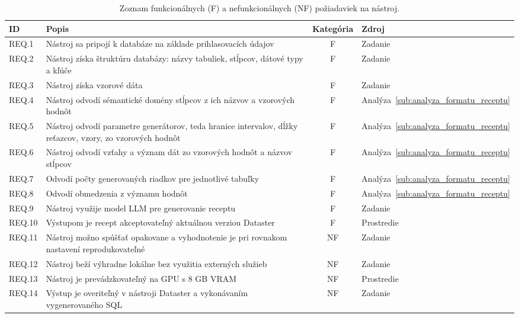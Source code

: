\begin{table}[H]
    \centering
    \begin{tabularx}{\textwidth}{l X c l}
         \toprule
         \textbf{ID} & \textbf{Popis} & \textbf{Kategória} & \textbf{Zdroj} \\
         \midrule
        REQ.1   & Nástroj sa pripojí k databáze na základe prihlasovacích údajov  & F & Zadanie \\ 
        REQ.2   & Nástroj získa štruktúru databázy: názvy tabuliek, stĺpcov, dátové typy a kľúče & F & Zadanie \\
        REQ.3   & Nástroj získa vzorové dáta & F & Zadanie \\ 
        REQ.4   & Nástroj odvodí sémantické domény stĺpcov z ich názvov a vzorových hodnôt & F & Analýza~\ref{sub:analyza_formatu_receptu} \\ 
        REQ.5   & Nástroj odvodí parametre generátorov, teda hranice intervalov, dĺžky reťazcov, vzory, zo vzorových hodnôt & F & Analýza~\ref{sub:analyza_formatu_receptu} \\ 
        REQ.6   & Nástroj odvodí vzťahy a význam dát zo vzorových hodnôt a názvov stĺpcov & F & Analýza~\ref{sub:analyza_formatu_receptu} \\ 
        REQ.7   & Odvodí počty  generovaných riadkov pre jednotlivé tabuľky & F & Analýza~\ref{sub:analyza_formatu_receptu} \\
        REQ.8   & Odvodí obmedzenia z významu hodnôt & F & Analýza~\ref{sub:analyza_formatu_receptu} \\ 
        REQ.9   & Nástroj využije model LLM pre generovanie receptu & F & Zadanie \\ 
        REQ.10  & Výstupom je recept akceptovateľný aktuálnou verziou Dataster & F & Prostredie \\ 
        REQ.11  & Nástroj možno spúšťať opakovane a vyhodnotenie je pri rovnakom nastavení reprodukovateľné\footnotemark & NF &Zadanie \\ 
        REQ.12  & Nástroj beží výhradne lokálne bez využitia externých služieb & NF & Zadanie \\
        REQ.13  & Nástroj je prevádzkovateľný na GPU s 8 GB VRAM & NF & Prostredie \\ 
        REQ.14  & Výstup je overiteľný v nástroji Dataster a vykonávaním vygenerovaného SQL & NF & Zadanie \\ 

         \bottomrule
    \end{tabularx}
    \caption{Zoznam funkcionálnych (F) a nefunkcionálnych (NF) požiadaviek na nástroj.}
    \label{tab:reqs}
\end{table}
